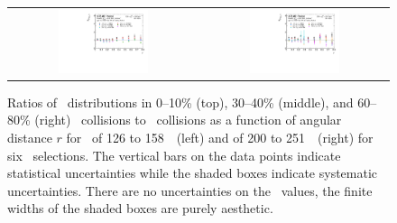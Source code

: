 \begin{figure}[h]
{\begin{tabular}{cc}
            \includegraphics[width=0.5\textwidth]{figures/results/RDpT_final_ratio_dR_CONF_data_jet7_cent5.pdf} & 
            \includegraphics[width=0.5\textwidth]{figures/results/RDpT_final_ratio_dR_CONF_data_jet9_cent5.pdf} \\
      \end{tabular}
      }
\caption{Ratios of \Dptr\ distributions in 0--10\% (top), 30--40\% (middle), and 60--80\% (right) \PbPb\ collisions to \pp\ collisions as a function of angular distance $r$ for \ptjet\ of 126 to 158~\GeV\ (left) and of 200 to 251~\GeV\ (right) for six \pt\ selections. The vertical bars on the data points indicate statistical uncertainties while the shaded boxes indicate systematic uncertainties. There are no uncertainties on the \rvar\ values, the finite widths of the shaded boxes are purely aesthetic.}
\label{fig:rdptr}
\end{figure}


